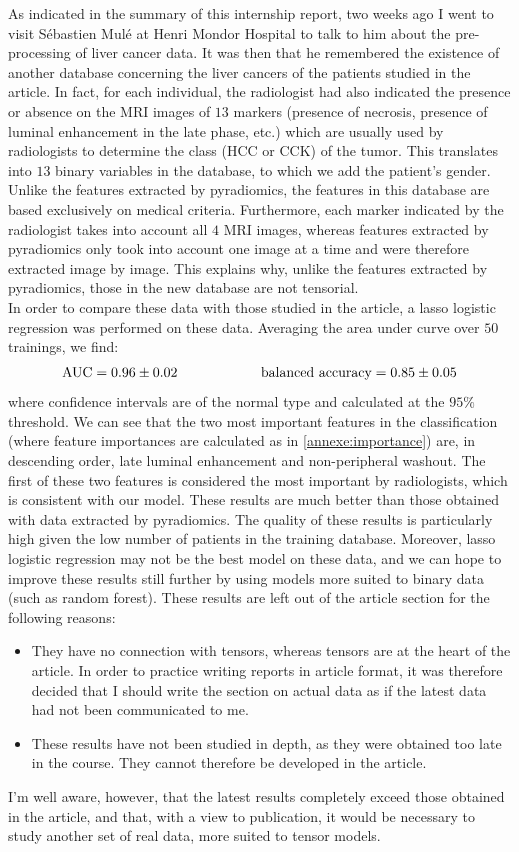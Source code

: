 \documentclass[preprint,12pt]{elsarticle}
\begin{document}
\noindent As indicated in the summary of this internship report, two weeks ago I went to visit Sébastien Mulé at Henri Mondor Hospital to talk to him about the pre-processing of liver cancer data. It was then that he remembered the existence of another database concerning the liver cancers of the patients studied in the article. In fact, for each individual, the radiologist had also indicated the presence or absence on the MRI images of $13$ markers (presence of necrosis, presence of luminal enhancement in the late phase, etc.) which are usually used by radiologists to determine the class (HCC or CCK) of the tumor. This translates into $13$ binary variables in the database, to which we add the patient's gender. Unlike the features extracted by pyradiomics, the features in this database are based exclusively on medical criteria. Furthermore, each marker indicated by the radiologist takes into account all $4$ MRI images, whereas features extracted by pyradiomics only took into account one image at a time and were therefore extracted image by image. This explains why, unlike the features extracted by pyradiomics, those in the new database are not tensorial.\\
\indent In order to compare these data with those studied in the article, a lasso logistic regression was performed on these data. Averaging the area under curve over $50$ trainings, we find:
$$
\text{AUC} = 0.96 \pm 0.02 \hspace{60 pt} \text{balanced accuracy} = 0.85 \pm 0.05
$$
where confidence intervals are of the normal type and calculated at the $95 \%$ threshold. We can see that the two most important features in the classification (where feature importances are calculated as in \ref{annexe:importance}) are, in descending order, late luminal enhancement and non-peripheral washout. The first of these two features is considered the most important by radiologists, which is consistent with our model. These results are much better than those obtained with data extracted by pyradiomics. The quality of these results is particularly high given the low number of patients in the training database. Moreover, lasso logistic regression may not be the best model on these data, and we can hope to improve these results still further by using models more suited to binary data (such as random forest). These results are left out of the article section for the following reasons:
\begin{itemize}[label = $\bullet$]
    \item They have no connection with tensors, whereas tensors are at the heart of the article. In order to practice writing reports in article format, it was therefore decided that I should write the section on actual data as if the latest data had not been communicated to me.
    \item These results have not been studied in depth, as they were obtained too late in the course. They cannot therefore be developed in the article.
\end{itemize}
I'm well aware, however, that the latest results completely exceed those obtained in the article, and that, with a view to publication, it would be necessary to study another set of real data, more suited to tensor models.
\end{document}
